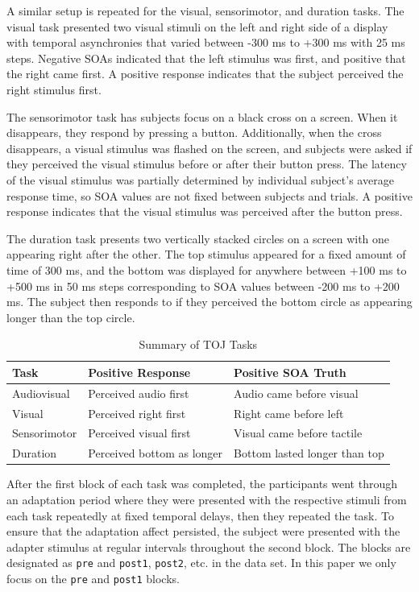 \documentclass[11pt, oneside, openany]{scrbook}
\begin{document}
A similar setup is repeated for the visual, sensorimotor, and duration tasks. The visual task presented two visual stimuli on the left and right side of a display with temporal asynchronies that varied between -300 ms to +300 ms with 25 ms steps. Negative SOAs indicated that the left stimulus was first, and positive that the right came first. A positive response indicates that the subject perceived the right stimulus first.

The sensorimotor task has subjects focus on a black cross on a screen. When it disappears, they respond by pressing a button. Additionally, when the cross disappears, a visual stimulus was flashed on the screen, and subjects were asked if they perceived the visual stimulus before or after their button press. The latency of the visual stimulus was partially determined by individual subject's average response time, so SOA values are not fixed between subjects and trials. A positive response indicates that the visual stimulus was perceived after the button press.

The duration task presents two vertically stacked circles on a screen with one appearing right after the other. The top stimulus appeared for a fixed amount of time of 300 ms, and the bottom was displayed for anywhere between +100 ms to +500 ms in 50 ms steps corresponding to SOA values between -200 ms to +200 ms. The subject then responds to if they perceived the bottom circle as appearing longer than the top circle.

\begin{table}[!h]

\caption{\label{tab:ch020-toj-summary}Summary of TOJ Tasks}
\centering
\begin{tabular}[t]{lll}
\toprule
Task & Positive Response & Positive SOA Truth\\
\midrule
Audiovisual & Perceived audio first & Audio came before visual\\
Visual & Perceived right first & Right came before left\\
Sensorimotor & Perceived visual first & Visual came before tactile\\
Duration & Perceived bottom as longer & Bottom lasted longer than top\\
\bottomrule
\end{tabular}
\end{table}

After the first block of each task was completed, the participants went through an adaptation period where they were presented with the respective stimuli from each task repeatedly at fixed temporal delays, then they repeated the task. To ensure that the adaptation affect persisted, the subject were presented with the adapter stimulus at regular intervals throughout the second block. The blocks are designated as \texttt{pre} and \texttt{post1}, \texttt{post2}, etc. in the data set. In this paper we only focus on the \texttt{pre} and \texttt{post1} blocks.
\end{document}
